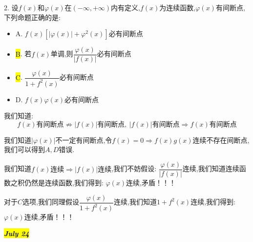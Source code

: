 2. 设$f(x)$和$\varphi(x)$在$(-\infty,+\infty)$内有定义,$f(x)$为连续函数,$\varphi(x)$有间断点,下列命题正确的是: 
\begin{itemize}
	\item A. $f(x)[|\varphi(x)|+\varphi^2(x)]$必有间断点
	\item \hl{B}. 若$f(x)$单调,则$\dfrac{\varphi(x)}{|f(x)|}$必有间断点
	\item \hl{C}. $\dfrac{\varphi(x)}{1+f^2(x)}$必有间断点
	\item D. $f(x)\varphi(x)$必有间断点
\end{itemize}
\begin{solution}
	
	我们知道: 
	$$f(x)\text{有间断点}\nRightarrow |f(x)|\text{有间断点},\ |f(x)|\text{有间断点}\Rightarrow f(x)\text{有间断点}$$
	
	我们知道$|\varphi(x)|$不一定有间断点,令$f(x)=0\Rightarrow f(x)g(x)$连续不存在间断点,我们可以得到$A, D$错误.
	
	我们知道$f(x)\text{连续}\Rightarrow |f(x)|\text{连续}$,我们不妨假设: $\dfrac{\varphi(x)}{|f(x)|}$连续,我们知道连续函数之积仍然是连续函数,我们得到: $\varphi(x)$连续,矛盾！！！
	
	对于$C$选项,我们同理假设$\dfrac{\varphi(x)}{1+f^2(x)}$连续,我们知道$1+f^{2}(x)$连续,我们得到: $\varphi(x)$连续,矛盾！！！
	
\end{solution}

\hl{\textbf{\textit{July 24}}}

